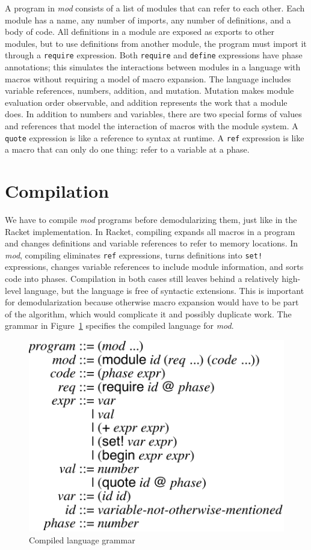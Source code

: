 A program in \emph{mod} consists of a list of modules that can refer to each other.
Each module has a name, any number of imports, any number of definitions, and a body of code. 
All definitions in a module are exposed as exports to other modules, but to use definitions from another module, the program must import it through a \texttt{require} expression.
Both \texttt{require} and \texttt{define} expressions have phase annotations; this simulates the interactions between modules in a language with macros without requiring a model of macro expansion.
The language includes variable references, numbers, addition, and mutation.
Mutation makes module evaluation order observable, and addition represents the work that a module does.
In addition to numbers and variables, there are two special forms of values and references that model the interaction of macros with the module system.
A \texttt{quote} expression is like a reference to syntax at runtime.
A \texttt{ref} expression is like a macro that can only do one thing: refer to a variable at a phase.

\section{Compilation}

We have to compile \emph{mod} programs before demodularizing them, just like in the Racket implementation.
In Racket, compiling expands all macros in a program and changes definitions and variable references to refer to memory locations.
In \emph{mod}, compiling eliminates \texttt{ref} expressions, turns definitions into \texttt{set!} expressions, changes variable references to include module information, and sorts code into phases.
Compilation in both cases still leaves behind a relatively high-level language, but the language is free of syntactic extensions.
This is important for demodularization because otherwise macro expansion would have to be part of the algorithm, which would complicate it and possibly duplicate work.
The grammar in Figure~\ref{fig:compiled-lang} specifies the compiled language for \emph{mod}.

\begin{figure}
\centering
\includegraphics{figures/compiled-lang}
\caption{Compiled language grammar}
\label{fig:compiled-lang}
\end{figure}

